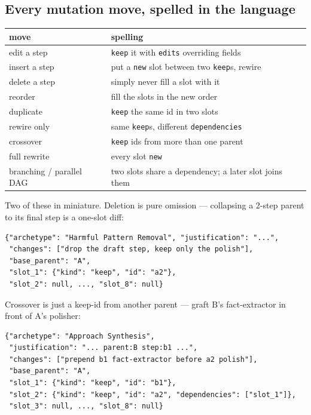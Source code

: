 \documentclass[11pt]{article}
\begin{document}
\subsection{Every mutation move, spelled in the language}
\begin{center}
\small
\begin{tabular}{ll}
\toprule
move & spelling \\
\midrule
edit a step & \texttt{keep} it with \texttt{edits} overriding fields \\
insert a step & put a \texttt{new} slot between two \texttt{keep}s, rewire \\
delete a step & simply never fill a slot with it \\
reorder & fill the slots in the new order \\
duplicate & \texttt{keep} the same id in two slots \\
rewire only & same \texttt{keep}s, different \texttt{dependencies} \\
crossover & \texttt{keep} ids from more than one parent \\
full rewrite & every slot \texttt{new} \\
branching / parallel DAG & two slots share a dependency; a later slot joins them \\
\bottomrule
\end{tabular}
\end{center}
Two of these in miniature. Deletion is pure omission --- collapsing a 2-step parent to its
final step is a one-slot diff:
\begin{lstlisting}
{"archetype": "Harmful Pattern Removal", "justification": "...",
 "changes": ["drop the draft step, keep only the polish"],
 "base_parent": "A",
 "slot_1": {"kind": "keep", "id": "a2"},
 "slot_2": null, ..., "slot_8": null}
\end{lstlisting}
Crossover is just a keep-id from another parent --- graft B's fact-extractor in front of A's
polisher:
\begin{lstlisting}
{"archetype": "Approach Synthesis",
 "justification": "... parent:B step:b1 ...",
 "changes": ["prepend b1 fact-extractor before a2 polish"],
 "base_parent": "A",
 "slot_1": {"kind": "keep", "id": "b1"},
 "slot_2": {"kind": "keep", "id": "a2", "dependencies": ["slot_1"]},
 "slot_3": null, ..., "slot_8": null}
\end{lstlisting}
\end{document}
